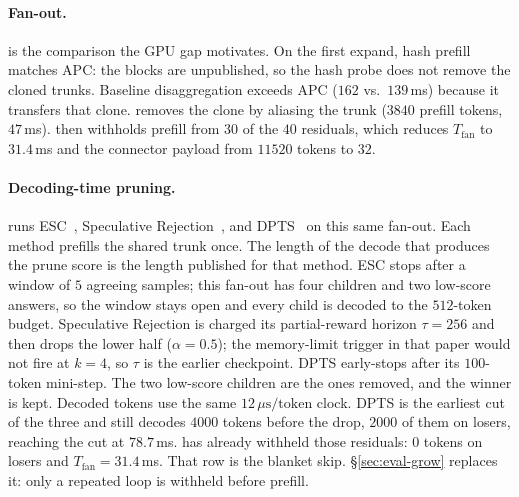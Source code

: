 \paragraph{Fan-out.}
 is the comparison the GPU gap motivates.
On the first expand, hash prefill matches APC: the blocks are unpublished, so the hash probe does not remove the cloned trunks.
Baseline disaggregation exceeds APC ($162$ vs.\ $139$\,ms) because it transfers that clone.
\sys removes the clone by aliasing the trunk ($3840$ prefill tokens, $47$\,ms).
\app then withholds prefill from $30$ of the $40$ residuals, which reduces $T_{\mathrm{fan}}$ to $31.4$\,ms and the connector payload from $11520$ tokens to $32$.

\paragraph{Decoding-time pruning.}
 runs ESC~\cite{esc}, Speculative Rejection~\cite{specrej}, and DPTS~\cite{dpts} on this same fan-out.
Each method prefills the shared trunk once.
The length of the decode that produces the prune score is the length published for that method.
ESC stops after a window of $5$ agreeing samples; this fan-out has four children and two low-score answers, so the window stays open and every child is decoded to the $512$-token budget.
Speculative Rejection is charged its partial-reward horizon $\tau{=}256$ and then drops the lower half ($\alpha{=}0.5$); the memory-limit trigger in that paper would not fire at $k{=}4$, so $\tau$ is the earlier checkpoint.
DPTS early-stops after its $100$-token mini-step.
The two low-score children are the ones removed, and the winner is kept.
Decoded tokens use the same $12\,\mu\mathrm{s}/\mathrm{token}$ clock.
DPTS is the earliest cut of the three and still decodes $4000$ tokens before the drop, $2000$ of them on losers, reaching the cut at $78.7$\,ms.
\app has already withheld those residuals: $0$ tokens on losers and $T_{\mathrm{fan}}{=}31.4$\,ms.
That row is the blanket skip.
\S\ref{sec:eval-grow} replaces it: only a repeated loop is withheld before prefill.

